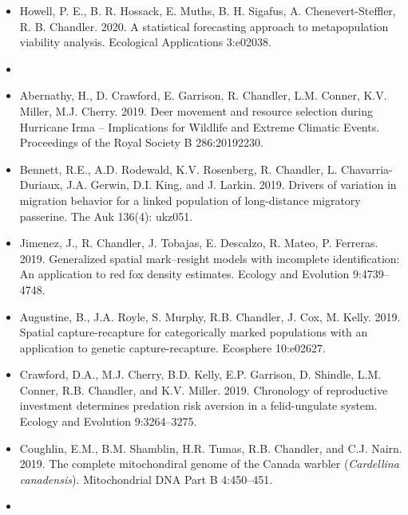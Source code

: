 \begin{itemize}
\item Howell, P. E., B. R. Hossack, E. Muths, B. H. Sigafus,
  A. Chenevert-Steffler, R. B. Chandler. 2020. A statistical 
  forecasting approach to metapopulation viability
  analysis. Ecological Applications 3:e02038. 

  
\item[] { \\}

\item Abernathy, H., D. Crawford, E. Garrison, R. Chandler,
  L.M. Conner, K.V. Miller, M.J. Cherry. 2019. Deer movement and
  resource selection during Hurricane Irma -- Implications for
  Wildlife and Extreme Climatic Events. Proceedings of the Royal
  Society B 286:20192230. 
  
\item Bennett, R.E., A.D. Rodewald, K.V. Rosenberg, R. Chandler,
  L. Chavarria-Duriaux, J.A. Gerwin, D.I. King, and
  J. Larkin. 2019. Drivers of variation in migration behavior for a
  linked population of long-distance migratory passerine. The Auk
  136(4): ukz051.
  
\item Jimenez, J., R. Chandler, J. Tobajas, E. Descalzo, R. Mateo,
  P. Ferreras. 2019. Generalized spatial mark–resight models with
  incomplete identification: An application to red fox density
  estimates. Ecology and Evolution 9:4739--4748. 
  
\item Augustine, B., J.A. Royle, S. Murphy, R.B. Chandler,
  J. Cox, M. Kelly. 2019. Spatial capture-recapture for
  categorically marked populations with an application to genetic
  capture-recapture. Ecosphere 10:e02627.

\item Crawford, D.A., M.J. Cherry, B.D. Kelly, E.P. Garrison,
  D. Shindle, L.M. Conner, R.B. Chandler, and
  K.V. Miller. 2019. Chronology of reproductive investment determines
  predation risk aversion in a felid-ungulate system. Ecology and
  Evolution 9:3264--3275. 

\item Coughlin, E.M., B.M. Shamblin, H.R. Tumas, R.B. Chandler, and
  C.J. Nairn. 2019. The complete mitochondiral genome of the
  Canada warbler ({\it Cardellina canadensis}). Mitochondrial DNA Part
  B 4:450--451.

  
\item[] { \\}


\end{itemize}

